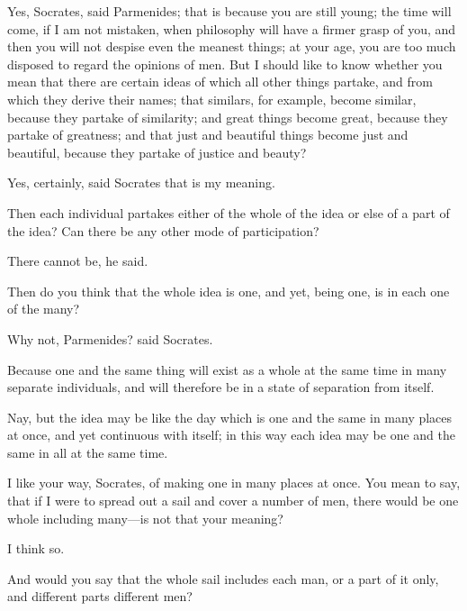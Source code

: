 \documentclass[11pt,letter]{article}
\begin{document}
\par  Yes, Socrates, said Parmenides; that is because you are still young; the time will come, if I am not mistaken, when philosophy will have a firmer grasp of you, and then you will not despise even the meanest things; at your age, you are too much disposed to regard the opinions of men. But I should like to know whether you mean that there are certain ideas of which all other things partake, and from which they derive their names; that similars, for example, become similar, because they partake of similarity; and great things become great, because they partake of greatness; and that just and beautiful things become just and beautiful, because they partake of justice and beauty?

\par  Yes, certainly, said Socrates that is my meaning.

\par  Then each individual partakes either of the whole of the idea or else of a part of the idea? Can there be any other mode of participation?

\par  There cannot be, he said.

\par  Then do you think that the whole idea is one, and yet, being one, is in each one of the many?

\par  Why not, Parmenides? said Socrates.

\par  Because one and the same thing will exist as a whole at the same time in many separate individuals, and will therefore be in a state of separation from itself.

\par  Nay, but the idea may be like the day which is one and the same in many places at once, and yet continuous with itself; in this way each idea may be one and the same in all at the same time.

\par  I like your way, Socrates, of making one in many places at once. You mean to say, that if I were to spread out a sail and cover a number of men, there would be one whole including many—is not that your meaning?

\par  I think so.

\par  And would you say that the whole sail includes each man, or a part of it only, and different parts different men?
\end{document}
